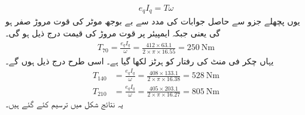 \begin{itemize}
\begin{align}
e_q I_q=T \omega
\end{align}
یوں پچھلے جزو سے حاصل جوابات کی مدد سے بے بوجھ موٹر کی قوت مروڑ  صفر ہو گی یعنی   جبکہ   ایمپیئر پر قوت مروڑ کی قیمت درج ذیل ہو گی۔
\begin{align*}
T_{70}=\frac{e_q I_q}{\omega}=\frac{412 \times 63.1}{2 \times \pi \times 16.55}=\SI{250}{\newton \meter}
\end{align*}
یہاں  چکر فی منٹ کی رفتار کو  ہرٹز لکھا گیا ہے۔ اسی طرح درج ذیل ہوں گے۔
\begin{align*}
T_{140}&=\frac{e_q I_q}{\omega}=\frac{408 \times 133.1}{2 \times \pi \times 16.38}=\SI{528}{\newton \meter}\\
T_{210}&=\frac{e_q I_q}{\omega}=\frac{405 \times  203.1}{2 \times \pi \times 16.27}=\SI{805}{\newton \meter}
\end{align*}
یہ نتائج شکل   میں ترسیم کئے گئے ہیں۔
\end{itemize}
